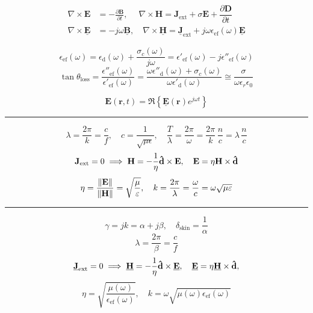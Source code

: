 \clearpage
\begin{myframe}
    \vspace{-0.75em}
    $$
        \begin{aligned}
            \nabla \times \mathbf{E} &= -\frac{\partial \mathbf{B}}{\partial t},
            \quad
            \;\nabla \times \mathbf{H} = \mathbf{J}_{\text{ext}} + \sigma \mathbf{E} + \dfrac{\partial \mathbf{D}}{\partial t}
            \\
            \nabla \times \mathbf{\underline{E}} &= -j\omega\mathbf{\underline{B}},
            \quad
            \nabla \times \mathbf{\underline{H}} = \mathbf{\underline{J}}_{\text{ext}} + j\omega \epsilon_{\text{ef}}(\omega) \mathbf{\underline{E}}
        \end{aligned}
    $$
    
    $$
        \epsilon_{\text{ef}}(\omega) = \epsilon_{\text{d}}(\omega) + \frac{\sigma_c(\omega)}{j\omega} 
        = \epsilon'_{\text{ef}}(\omega) - j\epsilon''_{\text{ef}}(\omega)
    $$
    $$
        \tan \theta_{\text{loss}} = \frac{\epsilon''_{\text{ef}}(\omega)}{\epsilon'_{\text{ef}}(\omega)}
        = \frac{\omega \epsilon''_{\text{d}}(\omega) + \sigma_c(\omega)}{\omega \epsilon'_{\text{d}}(\omega)}
        \cong \frac{\sigma}{\omega \epsilon_r \epsilon_0}
    $$
\end{myframe}
\begin{myframe}
    $$
         \mathbf{E}(\mathbf{r}, t) = \Re\left\{\underline{\mathbf{E}}(\mathbf{r}) e^{j\omega t}\right\}
    $$
    \hrule
    $$
        \lambda = \frac{2\pi}{k} = \frac{c}{f},
        \quad
        c = \frac{1}{\sqrt{\mu \epsilon}},
        \quad
        \frac{T}{\lambda} = \frac{2\pi}{\omega} = \frac{2\pi}{k}\,\frac{n}{c} = \lambda \, \frac{n}{c}
    $$
    $$
        \mathbf{J}_{\text{\text{ext}}} = 0 \implies \mathbf{H} = -\frac{1}{\eta}\mathbf{\hat{d}} \times \mathbf{E}, \quad \mathbf{E} = \eta\mathbf{H} \times \mathbf{\hat{d}}
    $$
    $$
        \eta = \frac{\lVert\mathbf{E}\rVert}{\lVert\mathbf{H}\rVert} = \sqrt{\frac{\mu}{\varepsilon}},
        \quad
        k = \frac{2\pi}{\lambda} = \frac{\omega}{c} = \omega \sqrt{\mu \varepsilon}
    $$
    \hrule\vskip 2mm
    $$
        \gamma = jk = \alpha + j\beta,
        \quad
        \delta_{\text{skin}} = \frac{1}{\alpha}
    $$
    $$
        \lambda = \frac{2\pi}{\beta} = \frac{c}{f}
    $$
    $$
        \mathbf{\underline{J}}_{\text{\text{ext}}} = 0 \implies \mathbf{\underline{H}} = -\frac{1}{\eta}\mathbf{\hat{d}} \times \mathbf{\underline{E}}, \quad \mathbf{\underline{E}} = \eta\mathbf{\underline{H}} \times \mathbf{\hat{d}},
    $$
    $$
        \eta = \sqrt{\frac{\mu(\omega)}{\epsilon_{\text{ef}}(\omega)}}, 
        \quad
        k = \omega \sqrt{\mu(\omega)\epsilon_{\text{ef}}(\omega)}
    $$
\end{myframe}
